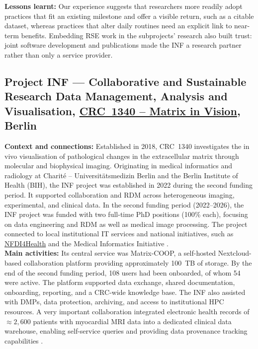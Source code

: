 \documentclass{eceasst}
\begin{document}
\medskip
\noindent\textbf{Lessons learnt:}
Our experience suggests that researchers more readily adopt practices that fit an existing milestone and offer a visible return, such as a citable dataset, whereas practices that alter daily routines need an explicit link to near-term benefits.
Embedding RSE work in the subprojects' research also built trust: joint software development and publications made the INF a research partner rather than only a service provider.

\subsection{Project INF --- Collaborative and Sustainable Research Data Management, Analysis and Visualisation, \href{https://gepris.dfg.de/gepris/projekt/372486779}{CRC~1340 -- Matrix in Vision}, Berlin}
\label{subsec:crc1340}
\noindent\textbf{Context and connections:}
Established in 2018, CRC~1340 investigates the in vivo
visualisation of pathological changes in the extracellular
matrix through molecular and biophysical imaging.
Originating in medical informatics and radiology at
Charité -- Universitätsmedizin Berlin and the Berlin
Institute of Health (BIH), the INF project was established
in 2022 during the second funding period.
It supported collaboration and RDM across heterogeneous imaging, experimental, and clinical data.
In the second funding period (2022–2026),
the INF project was funded with two full-time
PhD positions (100\% each),
focusing on data engineering and RDM
as well as medical image processing.
The project connected to local institutional IT
services and national initiatives, such as
\href{https://www.nfdi4health.de/}{NFDI4Health}
\cite{fluck_bausteine_2021} and the Medical Informatics
Initiative \cite{prasser_difuture_2018}.
\\
\noindent\textbf{Main activities:}
Its central service was Matrix-COOP,
a self-hosted Nextcloud-based collaboration platform
providing approximately 100~TB of storage.
By the end of the second funding period, 108 users had
been onboarded, of whom 54 were active.
The platform supported data exchange, shared documentation,
onboarding, reporting, and a CRC-wide knowledge base.
The INF also assisted with DMPs, data protection, archiving, and access to institutional HPC resources.
A very important collaboration integrated
electronic health records of $\approx 2,600$ patients
with myocardial MRI data into a dedicated clinical data
warehouse, enabling self-service queries and providing
data provenance tracking capabilities \cite{johns_prov_tracking_2025}.
\end{document}
